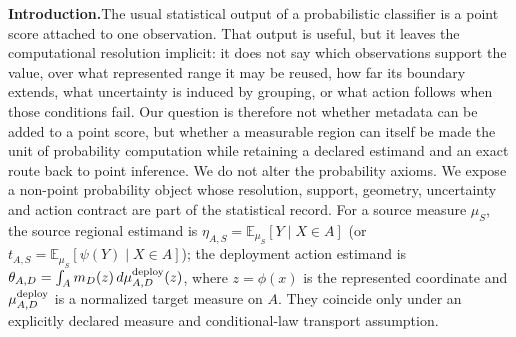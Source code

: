 \documentclass[10pt]{article}
\newcommand{\E}{\mathbb{E}}
\begin{document}
\textbf{Introduction.}\;The usual statistical output of a probabilistic classifier is a point score attached to one observation. That output is useful, but it leaves the computational resolution implicit: it does not say which observations support the value, over what represented range it may be reused, how far its boundary extends, what uncertainty is induced by grouping, or what action follows when those conditions fail. Our question is therefore not whether metadata can be added to a point score, but whether a measurable region can itself be made the unit of probability computation while retaining a declared estimand and an exact route back to point inference. We do not alter the probability axioms. We expose a non-point probability object whose resolution, support, geometry, uncertainty and action contract are part of the statistical record. For a source measure $\mu_S$, the source regional estimand is $\eta_{A,S}=\E_{\mu_S}[Y\mid X\in A]$ (or $t_{A,S}=\E_{\mu_S}[\psi(Y)\mid X\in A]$); the deployment action estimand is $\theta_{A,D}=\int_A m_D(z)\,d\mu^{\rm deploy}_{A,D}(z)$, where $z=\phi(x)$ is the represented coordinate and $\mu^{\rm deploy}_{A,D}$ is a normalized target measure on $A$. They coincide only under an explicitly declared measure and conditional-law transport assumption.
\end{document}
